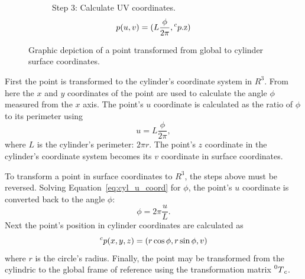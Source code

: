 \begin{figure}[htb]
\begin{subfigure}[b]{0.3\textwidth}
		\centering
{}
		\caption{%
Step 3: Calculate UV coordinates.
\begin{equation*}
	p(u,v) = (L \frac{\phi}{2\pi}, \prescript{c}{}p\text{.z})
\end{equation*}
}
	\end{subfigure}
	\caption{Graphic depiction of a point transformed from global to cylinder surface coordinates.}
	\label{fig:gl_ccyl_transform_steps}
\end{figure}

First the point is transformed to the cylinder's coordinate system in $R^3$.
From here the $x$ and $y$ coordinates of the point are used to calculate the angle $\phi$ measured from the $x$ axis.
The point's $u$ coordinate is calculated as the ratio of $\phi$ to its perimeter using
\begin{equation}\label{eq:cyl_u_coord}
	u = L \frac{\phi}{2\pi},
\end{equation}
where $L$ is the cylinder's perimeter: $2\pi r$.
The point's $z$ coordinate in the cylinder's coordinate system becomes its $v$ coordinate in surface coordinates.

To transform a point in surface coordinates to $R^3$, the steps above must be reversed.
Solving Equation~\ref{eq:cyl_u_coord} for $\phi$, the point's $u$ coordinate is converted back to the angle $\phi$:
\begin{equation*}
	\phi = 2\pi \frac{u}{L}.
\end{equation*}
Next the point's position in cylinder coordinates are calculated as
\begin{equation*}
	\prescript{c}{}p(x,y,z) = (r \cos \phi, r \sin \phi, v)
\end{equation*}
where $r$ is the circle's radius.
Finally, the point may be transformed from the cylindric to the global frame of reference using the transformation matrix $\prescript{0}{}T_c$.


